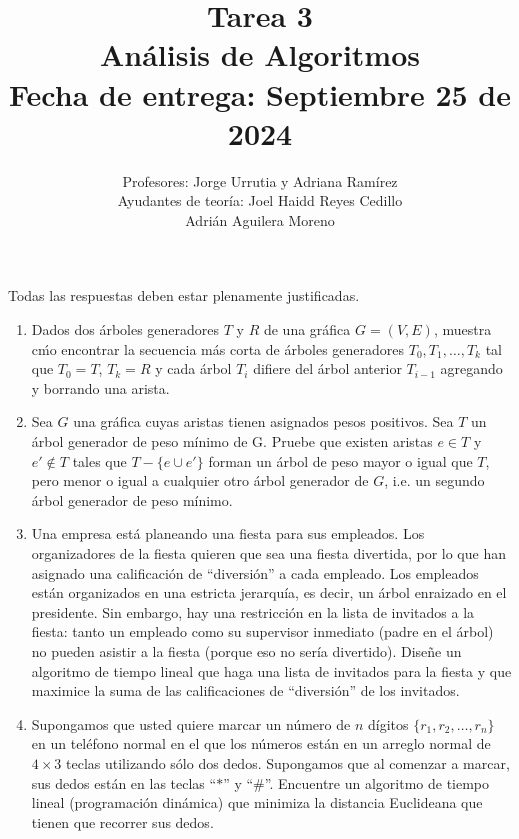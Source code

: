 \documentclass[11pt]{article}
\title{Tarea 3\\Análisis de Algoritmos\\ Fecha de entrega: Septiembre 25 de 2024}
\author{Profesores: Jorge Urrutia y Adriana Ramírez \phantom{aa}\\ Ayudantes de teor\'ia: Joel Haidd Reyes Cedillo\\  \phantom{aaaaaaaaaaaaaaaaa} Adri\'an Aguilera Moreno \\}
\date{}
\begin{document}
\maketitle

\vspace{-15pt}
Todas las respuestas deben estar plenamente justificadas.


\begin{enumerate}

	\item Dados dos \'arboles generadores $T$ y $R$ de una gr\'afica $G = (V, E)$, muestra c\'mo encontrar la secuencia m\'as corta de \'arboles generadores $T_0, T_1, \dots, T_k$ tal que $T_0 = T$, $T_k = R$ y cada \'arbol $T_i$ difiere del \'arbol anterior $T_{i-1}$ agregando y borrando una arista.

    \item Sea $G$ una gr\'afica cuyas aristas tienen asignados pesos positivos. Sea $T$ un \'arbol generador de peso m\'inimo de G. Pruebe que existen aristas $e \in T$ y $e' \notin T$ tales que $T - \{e \cup e'\}$ forman un \'arbol de peso mayor o igual que $T$, pero menor o igual a cualquier otro \'arbol generador de $G$, i.e. un segundo \'arbol generador de peso m\'inimo.

    \item Una empresa est\'a planeando una fiesta para sus empleados. Los organizadores de la fiesta quieren que sea una fiesta divertida, por lo que han asignado una calificaci\'on de ``diversi\'on'' a cada empleado. Los empleados est\'an organizados en una estricta jerarqu\'ia, es decir, un \'arbol enraizado en el presidente. Sin embargo, hay una restricci\'on en la lista de invitados a la fiesta: tanto un empleado como su supervisor inmediato (padre en el \'arbol) no pueden asistir a la fiesta (porque eso no ser\'ia divertido). Dise\~ne un algoritmo de tiempo lineal que haga una lista de invitados para la fiesta y que maximice la suma de las calificaciones de ``diversi\'on'' de los invitados.

    \item Supongamos que usted quiere marcar un n\'umero de $n$ d\'igitos $\{r_1, r_2, \dots, r_n\}$ en un tel\'efono normal en el que los n\'umeros est\'an en un arreglo normal de $4 \times 3$ teclas utilizando s\'olo dos dedos. Supongamos que al comenzar a marcar, sus dedos est\'an en las teclas ``$*$'' y ``$\#$''. Encuentre un algoritmo de tiempo lineal (programaci\'on din\'amica) que minimiza la distancia Euclideana que tienen que recorrer sus dedos.


\end{enumerate}
\end{document}
